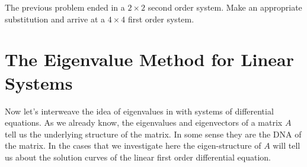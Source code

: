 
\begin{problem}
    The previous problem ended in a $2\times 2$ second order system.  Make an appropriate
    substitution and arrive at a $4\times 4$ first order system.  
\end{problem}


%             



\section{The Eigenvalue Method for Linear Systems}
Now let's interweave the idea of eigenvalues in with systems of differential equations. As
we already know, the eigenvalues and eigenvectors of a matrix $A$ tell us the underlying
structure of the matrix.  In some sense they are the DNA of the matrix.  In the cases that
we investigate here the eigen-structure of $A$ will tell us about the solution curves of
the linear first order differential equation.

